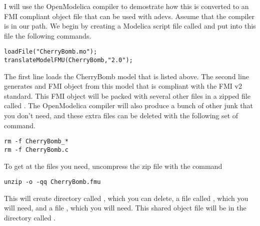 I will use the OpenModelica compiler to demostrate how this is converted to an FMI compliant object file that can be used with adevs. Assume that the compiler  is in our path. We begin by creating a Modelica script file called  and put into this file the following commands.
\begin{verbatim}
loadFile("CherryBomb.mo");
translateModelFMU(CherryBomb,"2.0");
\end{verbatim}
The first line loads the CherryBomb model that is listed above. The second line generates and FMI object from this model that is compliant with the FMI v2 standard. This FMI object will be packed with several other files in a zipped file called . The OpenModelica compiler will also produce a bunch of other junk that you don't need, and these extra files can be deleted with the following set of command.
\begin{verbatim}
rm -f CherryBomb_*
rm -f CherryBomb.c
\end{verbatim}
To get at the files you need, uncompress the zip file with the command
\begin{verbatim}
unzip -o -qq CherryBomb.fmu
\end{verbatim}
This will create directory called , which you can delete, a file called , which you will need, and a file , which you will need. This shared object file will be in the directory called .

